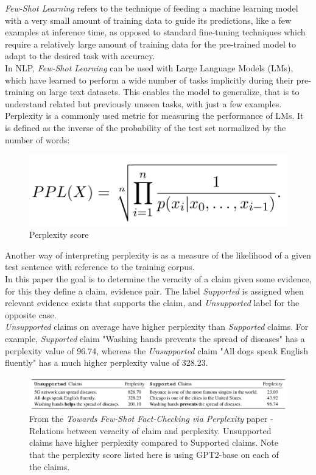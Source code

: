 \documentclass[10pt, english]{report}
\begin{document}
\textit{Few-Shot Learning} refers to the technique of feeding a machine learning model with a very small amount of training data to guide its predictions, like a few examples at inference time, as opposed to standard fine-tuning techniques which require a relatively large amount of training data for the pre-trained model to adapt to the desired task with accuracy.\\
In NLP, \textit{Few-Shot Learning} can be used with Large Language Models (LMs), which have learned to perform a wide number of tasks implicitly during their pre-training on large text datasets. This enables the model to generalize, that is to understand related but previously unseen tasks, with just a few examples.\\

Perplexity is a commonly used metric for measuring the performance of LMs. It is defined as the inverse of the probability of the test set normalized by the number of words:

\begin{figure}[H]
	\centering
	\includegraphics[scale=0.2]{img/perplexity_equation.png}
	\caption{Perplexity score}
\end{figure}

Another way of interpreting perplexity is as a measure of the likelihood of a given test sentence with reference to the training corpus.\\

In this paper the goal is to determine the veracity of a claim given some evidence, for this they define a {claim, evidence} pair. The label \emph{Supported} is assigned when relevant evidence exists that supports the claim, and \emph{Unsupported} label for the opposite case.\\
\emph{Unsupported} claims on average have higher perplexity than \emph{Supported} claims. For example, \emph{Supported} claim "Washing hands prevents the spread of diseases" has a perplexity value of 96.74, whereas the \emph{Unsupported} claim "All dogs speak English fluently" has a much higher perplexity value of 328.23. 

\begin{figure}[H]
	\centering
	\includegraphics[scale=0.43]{img/supported_unsupported_perplexity.png}
	\caption{From the \textit{Towards Few-Shot Fact-Checking via Perplexity} paper - Relations between veracity of claim and perplexity. Unsupported claims have higher perplexity compared to Supported claims. Note that the perplexity score listed here is using GPT2-base on each of the claims.}
\end{figure}
\end{document}

